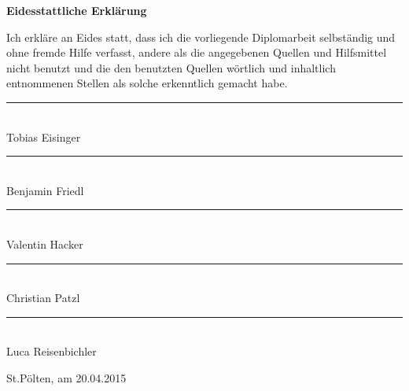 \begin{flushleft}
\Large
\textbf{Eidesstattliche Erklärung\\}
\vspace{1.5cm}
\end{flushleft}


Ich erkläre an Eides statt, dass ich die vorliegende Diplomarbeit selbständig und ohne fremde Hilfe verfasst, andere als die angegebenen Quellen
und Hilfsmittel nicht benutzt und die den benutzten Quellen wörtlich und inhaltlich entnommenen Stellen als solche erkenntlich gemacht habe.

\begin{center}
	\vspace{1.5cm}
	\rule{200pt}{1pt} \\
	Tobias Eisinger
	
	\vspace{1.5cm}
	\rule{200pt}{1pt} \\
	Benjamin Friedl

    \vspace{1.5cm}
	\rule{200pt}{1pt} \\
	Valentin Hacker

    \vspace{1.5cm}
	\rule{200pt}{1pt} \\
	Christian Patzl

    \vspace{1.5cm}
	\rule{200pt}{1pt} \\
	Luca Reisenbichler
\end{center}

St.Pölten, am 20.04.2015
	
	
